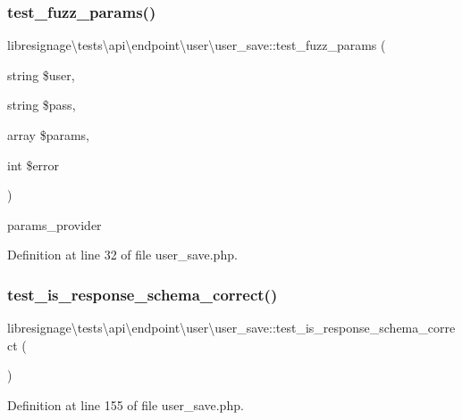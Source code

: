 \subsubsection{\texorpdfstring{test\+\_\+fuzz\+\_\+params()}{test\_fuzz\_params()}}
{\footnotesize\ttfamily libresignage\textbackslash{}tests\textbackslash{}api\textbackslash{}endpoint\textbackslash{}user\textbackslash{}user\+\_\+save\+::test\+\_\+fuzz\+\_\+params (\begin{DoxyParamCaption}\item[{string}]{\$user,  }\item[{string}]{\$pass,  }\item[{array}]{\$params,  }\item[{int}]{\$error }\end{DoxyParamCaption})}

params\+\_\+provider 

Definition at line 32 of file user\+\_\+save.\+php.

\mbox{\label{classlibresignage_1_1tests_1_1api_1_1endpoint_1_1user_1_1user__save_af388efc23e95fc9bd0cbc3aa68880d91}} 
\subsubsection{\texorpdfstring{test\+\_\+is\+\_\+response\+\_\+schema\+\_\+correct()}{test\_is\_response\_schema\_correct()}}
{\footnotesize\ttfamily libresignage\textbackslash{}tests\textbackslash{}api\textbackslash{}endpoint\textbackslash{}user\textbackslash{}user\+\_\+save\+::test\+\_\+is\+\_\+response\+\_\+schema\+\_\+correct (\begin{DoxyParamCaption}{ }\end{DoxyParamCaption})}



Definition at line 155 of file user\+\_\+save.\+php.




